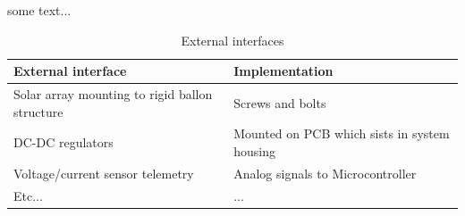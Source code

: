 some text...

\begin{table}[bht]
\centering
\begin{tabular}{m{}m{}}
\hline
\textbf{External interface} & \textbf{Implementation}\\
\hline
Solar array mounting to rigid ballon structure & Screws and bolts\\[2mm]
DC-DC regulators & Mounted on PCB which sists in system housing\\[2mm]
Voltage/current sensor telemetry & Analog signals to Microcontroller\\[2mm]
Etc... & ... \\
\hline
\end{tabular}
\caption{External interfaces}
\label{tab:external_interfaces}
\end{table}

